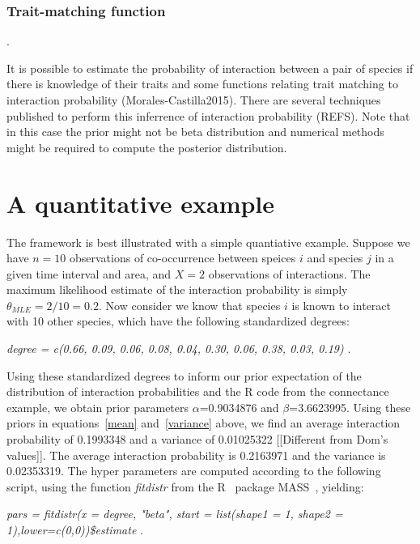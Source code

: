 \documentclass[12pt]{article}
\begin{document}
  \subsubsection*{Trait-matching function}. 

  It is possible to estimate the probability of interaction between a pair of species if there is knowledge of their traits and some functions relating trait matching to interaction probability (Morales-Castilla2015). There are several techniques published to perform this inferrence of interaction probability (REFS). Note that in this case the prior might not be beta distribution and numerical methods might be required to compute the posterior distribution.  


\section*{A quantitative example}

The framework is best illustrated with a simple quantiative example. Suppose we have $n = 10$ observations of co-occurrence between speices $i$ and species $j$ in a given time interval and area, and $X = 2$ observations of interactions. The maximum likelihood estimate of the interaction probability is simply $\theta_{MLE} = 2/10 = 0.2$.  Now consider we know that species $i$ is known to interact with 10 other species, which have the following standardized degrees:

\vspace{12pt}
\noindent\emph{
    degree = c(0.66, 0.09, 0.06, 0.08, 0.04, 0.30, 0.06, 0.38, 0.03, 0.19)
    }.
  \vspace{12pt}


Using these standardized degrees to inform our prior expectation of the 
distribution of interaction probabilities and the R code from the 
connectance example, we obtain prior parameters $\alpha$=0.9034876 
and $\beta$=3.6623995. Using these priors in equations~\ref{mean} 
and~\ref{variance} above, we find an average interaction probability of 0.1993348 and a variance of 0.01025322 [[Different from Dom's values]].
The average interaction probability is 0.2163971 and the variance is 0.02353319. The hyper parameters are computed according to the following script, using the function \emph{fitdistr} from the R~\citep{R} package MASS~\citep{MASS}, yielding:

\vspace{12pt}
\noindent\emph{    pars = fitdistr(x = degree, "beta", start = list(shape1 = 1, shape2 = 1),lower=c(0,0))\$estimate }.
  \vspace{12pt}
\end{document}
